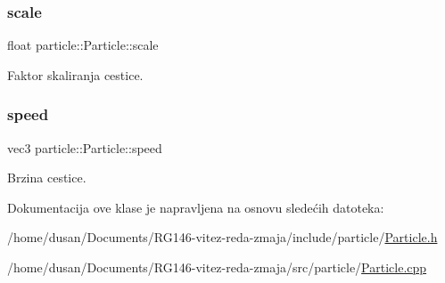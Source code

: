 \subsubsection{\texorpdfstring{scale}{scale}}
{\footnotesize\ttfamily float particle\+::\+Particle\+::scale\hspace{0.3cm}{\ttfamily [private]}}



Faktor skaliranja cestice. 

\mbox{\label{classparticle_1_1Particle_a24b42fc49ed65250499e0ba059764f0c}} 
\subsubsection{\texorpdfstring{speed}{speed}}
{\footnotesize\ttfamily vec3 particle\+::\+Particle\+::speed\hspace{0.3cm}{\ttfamily [private]}}



Brzina cestice. 



Dokumentacija ove klase je napravljena na osnovu sledećih datoteka\+:\begin{DoxyCompactItemize}
\item 
/home/dusan/\+Documents/\+R\+G146-\/vitez-\/reda-\/zmaja/include/particle/\hyperlink{Particle_8h}{Particle.\+h}\item 
/home/dusan/\+Documents/\+R\+G146-\/vitez-\/reda-\/zmaja/src/particle/\hyperlink{Particle_8cpp}{Particle.\+cpp}\end{DoxyCompactItemize}
